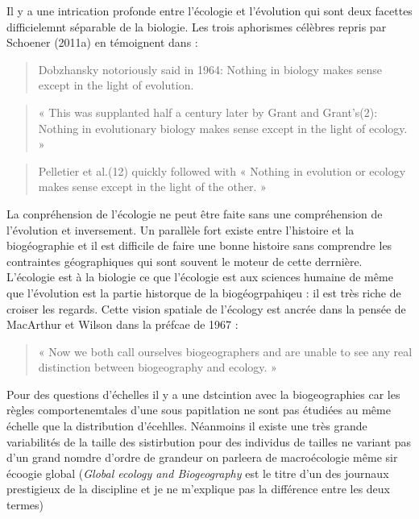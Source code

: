 Il y a une intrication profonde entre l'écologie et l'évolution qui sont
deux facettes difficielemnt séparable de la biologie. Les trois
aphorismes célèbres repris par Schoener (2011a) en témoignent dans :

\begin{quote}
\guillemotleft Dobzhansky notoriously said in 1964: Nothing in biology
makes sense except in the light of evolution. \guillemotright
\end{quote}

\begin{quote}
« This was supplanted half a century later by Grant and Grant's(2):
Nothing in evolutionary biology makes sense except in the light of
ecology. »
\end{quote}

\begin{quote}
Pelletier et al.(12) quickly followed with « Nothing in evolution or
ecology makes sense except in the light of the other. »
\end{quote}

La conpréhension de l'écologie ne peut être faite sans une compréhension
de l'évolution et inversement. Un parallèle fort existe entre l'histoire
et la biogéographie et il est difficile de faire une bonne histoire sans
comprendre les contraintes géographiques qui sont souvent le moteur de
cette derrnière. L'écologie est à la biologie ce que l'écologie est aux
sciences humaine de même que l'évolution est la partie historque de la
biogéogrpahiqeu : il est très riche de croiser les regards. Cette vision
spatiale de l'écology est ancrée dans la pensée de MacArthur et Wilson
dans la préfcae de 1967 :

\begin{quote}
« Now we both call ourselves biogeographers and are unable to see any
real distinction between biogeography and ecology. »
\end{quote}

Pour des questions d'échelles il y a une dstcintion avec la
biogeographies car les règles comportenemtales d'une sous papitlation ne
sont pas étudiées au même échelle que la distribution d'écehlles.
Néanmoins il existe une très grande variabilités de la taille des
sistirbution pour des individus de tailles ne variant pas d'un grand
nomdre d'ordre de grandeur on parleera de macroécologie même sir écoogie
global (\emph{Global ecology and Biogeography} est le titre d'un des
journaux prestigieux de la discipline et je ne m'explique pas la
différence entre les deux termes)


